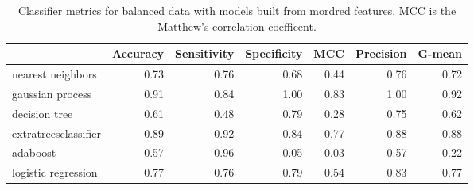 \begin{table}[H]
\centering
\caption{Classifier metrics for balanced data with models built from mordred features. MCC is the Matthew’s correlation coefficent.}
\label{tbl:mordred_features}
\begin{tabular}{lrrrrrr}
\toprule
{} &  Accuracy &  Sensitivity &  Specificity &  MCC &  Precision &  G-mean \\
\midrule
nearest neighbors    &      0.73 &         0.76 &         0.68 & 0.44 &       0.76 &    0.72 \\
gaussian process     &      0.91 &         0.84 &         1.00 & 0.83 &       1.00 &    0.92 \\
decision tree        &      0.61 &         0.48 &         0.79 & 0.28 &       0.75 &    0.62 \\
extratreesclassifier &      0.89 &         0.92 &         0.84 & 0.77 &       0.88 &    0.88 \\
adaboost             &      0.57 &         0.96 &         0.05 & 0.03 &       0.57 &    0.22 \\
logistic regression  &      0.77 &         0.76 &         0.79 & 0.54 &       0.83 &    0.77 \\
\bottomrule
\end{tabular}
\end{table}
